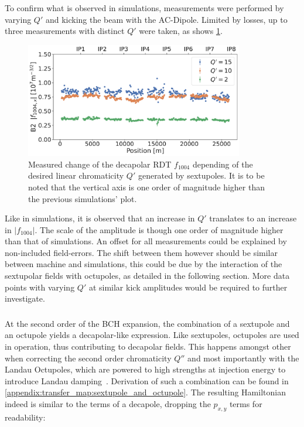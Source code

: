 To confirm what is observed in simulations, measurements were performed by varying $Q'$ and kicking
the beam with the AC-Dipole. Limited by losses, up to three measurements with distinct $Q'$ were
taken, as shows \cref{fig:decapoles:rdts:measured_f1004_from_sextupoles}.

\begin{figure}[!htb]
    \centering
    \includegraphics[width=0.85\textwidth]{./images/f1004/f1004x_q2_q10_q15.pdf}
    \caption{Measured change of the decapolar RDT $f_{1004}$ depending of the desired linear
    chromaticity $Q'$ generated by sextupoles. It is to be noted that the vertical axis is one
    order of magnitude higher than the previous simulations' plot.
    }
    \label{fig:decapoles:rdts:measured_f1004_from_sextupoles}
\end{figure}

Like in simulations, it is observed that an increase in $Q'$ translates to an increase in 
$|f_{1004}|$. The scale of the amplitude is though one order of magnitude higher than that of
simulations. An offset for all measurements could be explained by non-included field-errors. The
shift between them however should be similar between machine and simulations, this could be
due by the interaction of the sextupolar fields with octupoles, as detailed in the following
section. More data points with varying $Q'$ at similar kick amplitudes would be required to further
investigate.


\subsubsection{}


At the second order of the BCH expansion, the combination of a sextupole and an octupole yields a
decapolar-like expression.
Like sextupoles, octupoles are used in operation, thus contributing to decapolar fields. This
happens amongst other when correcting the second order chromaticity $Q''$ and most importantly with
the Landau Octupoles, which are powered to high strengths at injection energy to introduce Landau
damping~\cite{gareyte_landau_1997}.
Derivation of such a combination can be found in
\cref{appendix:transfer_map:sextupole_and_octupole}. The resulting Hamiltonian indeed is similar to
the terms of a decapole, dropping the $p_{x,y}$ terms for readability:

